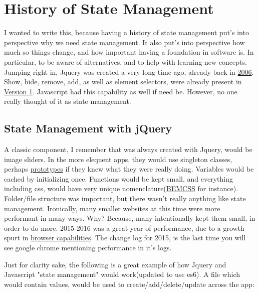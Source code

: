 \maketitle{}
\section{ History of State Management }

I wanted to write this, because having a history of state management put's into
perspective why we need state management. It also put's into perspective how
much so things change, and how important having a foundation in software is.
In particular, to be aware of alternatives, and to help with learning new
concepts. Jumping right in, Jquery was created a very long time ago, already
back in \href{https://en.wikipedia.org/wiki/JQuery}{2006}. Show, hide, remove,
add, as well as element selectors, were already present in
\href{http://api.jquery.com/category/version/1.0/}{Version 1}. Javascript had
this capability as well if need be. However, no one really thought of it as
state management.

\subsection{ State Management with jQuery }
A classic component, I remember that was always created with Jquery, would be
image sliders. In the more elequent apps, they would use singleton classes,
perhaps \href{https://www.w3schools.com/js/js\_object\_prototypes.asp}{prototypes}
if they knew what they were really doing. Variables would be cached by
initializing once. Functions would be kept small, and everything including css,
would have very unique nomenclature(\href{http://getbem.com/introduction/}{BEMCSS}
for instance). Folder/file structure was important, but there wasn't really
anything like state management. Ironically, many smaller websites at this time
were more performant in many ways. Why? Because, many intentionally kept them
small, in order to do more. 2015-2016 was a great year of performance, due to a
growth spurt in \href{https://chromereleases.googleblog.com/2015/03/stable-channel-update.html}{browser capabilities}.
The change log for 2015, is the last time you will see google chrome mentioning
performance in it's logs.

Just for clarity sake, the following is a great example of how Jquery and
Javascript "state management" would work(updated to use es6). A file which would
contain values, would be used to create/add/delete/update across the app:

